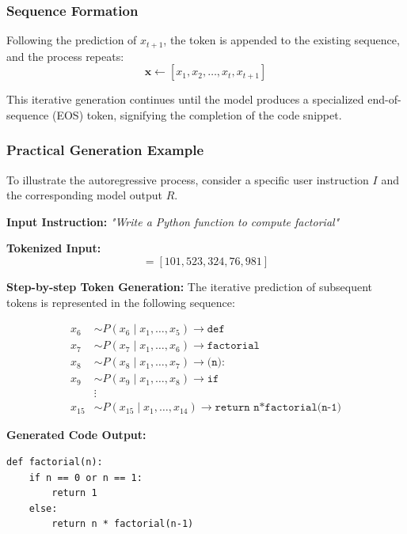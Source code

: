 \subsubsection{Sequence Formation}
Following the prediction of $x_{t+1}$, the token is appended to the existing sequence, and the process repeats:
\begin{equation}
\mathbf{x} \leftarrow [x_1, x_2, \dots, x_t, x_{t+1}]
\end{equation}

This iterative generation continues until the model produces a specialized end-of-sequence (EOS) token, signifying the completion of the code snippet.

\subsubsection{Practical Generation Example}
To illustrate the autoregressive process, consider a specific user instruction $I$ and the corresponding model output $R$.

\textbf{Input Instruction:}  
\textit{"Write a Python function to compute factorial"}

\textbf{Tokenized Input:}  
\begin{equation}
[x_1, x_2, x_3, x_4, x_5] = [101, 523, 324, 76, 981]
\end{equation}

\textbf{Step-by-step Token Generation:}  
The iterative prediction of subsequent tokens is represented in the following sequence:

\begin{equation}
\begin{aligned}
x_6 &\sim P(x_6 \mid x_1, \dots, x_5) \longrightarrow \texttt{def} \\
x_7 &\sim P(x_7 \mid x_1, \dots, x_6) \longrightarrow \texttt{factorial} \\
x_8 &\sim P(x_8 \mid x_1, \dots, x_7) \longrightarrow \texttt{(n):} \\
x_9 &\sim P(x_9 \mid x_1, \dots, x_8) \longrightarrow \texttt{if} \\
& \vdots \\
x_{15} &\sim P(x_{15} \mid x_1, \dots, x_{14}) \longrightarrow \texttt{return n*factorial(n-1)}
\end{aligned}
\end{equation}

\textbf{Generated Code Output:}



\begin{small}
\begin{verbatim}
def factorial(n):
    if n == 0 or n == 1:
        return 1
    else:
        return n * factorial(n-1)
\end{verbatim}
\end{small}

